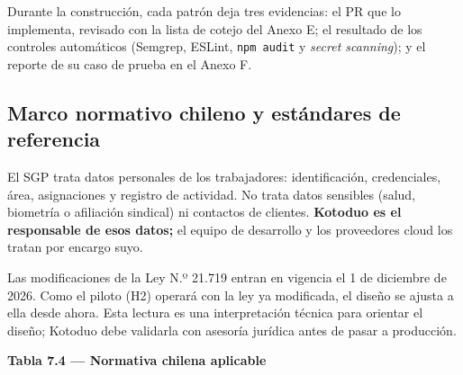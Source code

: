 \documentclass[11pt,a4paper]{article}
\begin{document}
Durante la construcción, cada patrón deja tres evidencias: el PR que lo implementa, revisado con la lista de cotejo del Anexo E; el resultado de los controles automáticos (Semgrep, ESLint, \texttt{npm audit} y \textit{secret scanning}); y el reporte de su caso de prueba en el Anexo F.

\subsection{Marco normativo chileno y estándares de referencia}

El SGP trata datos personales de los trabajadores: identificación, credenciales, área, asignaciones y registro de actividad. No trata datos sensibles (salud, biometría o afiliación sindical) ni contactos de clientes. \textbf{Kotoduo es el responsable de esos datos;} el equipo de desarrollo y los proveedores cloud los tratan por encargo suyo.

Las modificaciones de la Ley N.º 21.719 entran en vigencia el 1 de diciembre de 2026. Como el piloto (H2) operará con la ley ya modificada, el diseño se ajusta a ella desde ahora. Esta lectura es una interpretación técnica para orientar el diseño; Kotoduo debe validarla con asesoría jurídica antes de pasar a producción.

\textbf{Tabla 7.4 --- Normativa chilena aplicable}\nopagebreak
\end{document}
